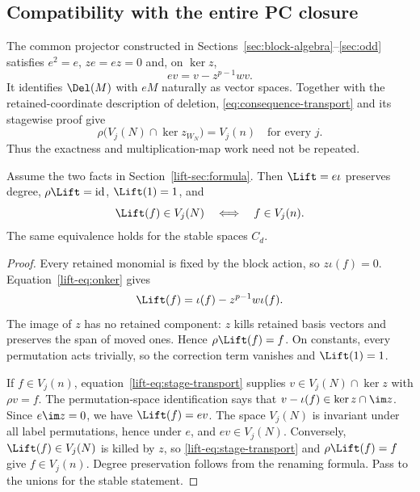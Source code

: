 \subsection{Compatibility with the entire PC closure}\label{lift-sec:verify}
The common projector constructed in Sections~\ref{sec:block-algebra}--\ref{sec:odd}
satisfies $e^2=e$, $ze=ez=0$ and, on $\ker z$,
\begin{equation}\label{lift-eq:onker}
                       ev=v-z^{p-1}wv.
\end{equation}
It identifies $\Del(M)$ with $eM$ naturally as vector spaces.
Together with the retained-coordinate description of deletion,
\eqref{eq:consequence-transport} and its stagewise proof give
\begin{equation}\label{lift-eq:stage-transport}
 \rho\bigl(V_j(N)\cap\ker z_{W_N}\bigr)=V_j(n)\quad\text{for every }j.
\end{equation}
Thus the exactness and multiplication-map work need not be repeated.

\begin{proposition}\label{lift-prop:lift}
Assume the two facts in Section~\ref{lift-sec:formula}. Then
$\Lift=e\iota$ preserves degree, $\rho\Lift=\mathrm{id}$,
$\Lift(1)=1$, and
\[
                  \Lift(f)\in V_j(N)\quad\Longleftrightarrow\quad
                  f\in V_j(n).
\]
The same equivalence holds for the stable spaces $C_d$.
\end{proposition}
\begin{proof}
Every retained monomial is fixed by the block action, so $z\iota(f)=0$.
Equation~\eqref{lift-eq:onker} gives
\[
                  \Lift(f)=\iota(f)-z^{p-1}w\iota(f).
\]
The image of $z$ has no retained component: $z$ kills retained basis
vectors and preserves the span of moved ones. Hence $\rho\Lift(f)=f$.
On constants, every permutation acts trivially, so the correction term
vanishes and $\Lift(1)=1$.

If $f\in V_j(n)$, equation~\eqref{lift-eq:stage-transport} supplies
$v\in V_j(N)\cap\ker z$ with $\rho v=f$. The permutation-space
identification says that $v-\iota(f)\in\ker z\cap\im z$. Since
$e\im z=0$, we have $\Lift(f)=ev$. The space $V_j(N)$ is invariant
under all label permutations, hence under $e$, and $ev\in V_j(N)$.
Conversely, $\Lift(f)\in V_j(N)$ is killed by $z$, so
\eqref{lift-eq:stage-transport} and $\rho\Lift(f)=f$ give $f\in V_j(n)$.
Degree preservation follows from the renaming formula. Pass to the
unions for the stable statement.
\end{proof}

